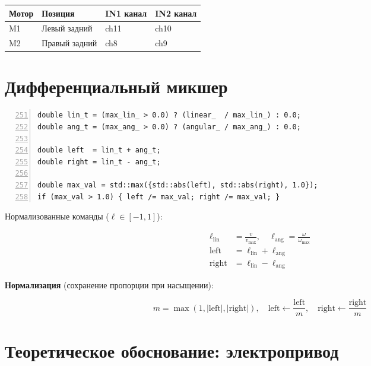 \begin{center}
\begin{tabular}{llll}
\toprule
\textbf{Мотор} & \textbf{Позиция} & \textbf{IN1 канал} & \textbf{IN2 канал}\\
\midrule
M1 & Левый задний    & ch11 & ch10\\
M2 & Правый задний   & ch8  & ch9\\
\bottomrule
\end{tabular}
\end{center}

\section{Дифференциальный микшер}

\begin{filebox}[title={\filepath{motor\_node.cpp}, строки 251--266}]
\begin{lstlisting}[style=cppstyle, numbers=left, firstnumber=251]
double lin_t = (max_lin_ > 0.0) ? (linear_  / max_lin_) : 0.0;
double ang_t = (max_ang_ > 0.0) ? (angular_ / max_ang_) : 0.0;

double left  = lin_t + ang_t;
double right = lin_t - ang_t;

double max_val = std::max({std::abs(left), std::abs(right), 1.0});
if (max_val > 1.0) { left /= max_val; right /= max_val; }
\end{lstlisting}
\end{filebox}

Нормализованные команды ($\ell \in [-1, 1]$):

\begin{align}
  \ell_{\text{lin}} &= \frac{v}{v_{\max}}, \quad
  \ell_{\text{ang}} = \frac{\omega}{\omega_{\max}} \label{eq:norm_cmd}\\[6pt]
  \text{left}  &= \ell_{\text{lin}} + \ell_{\text{ang}} \label{eq:left_mix}\\
  \text{right} &= \ell_{\text{lin}} - \ell_{\text{ang}} \label{eq:right_mix}
\end{align}

\textbf{Нормализация} (сохранение пропорции при насыщении):

\begin{equation}
  m = \max(1, |\text{left}|, |\text{right}|), \quad
  \text{left} \leftarrow \frac{\text{left}}{m}, \quad
  \text{right} \leftarrow \frac{\text{right}}{m}
  \label{eq:mix_normalize}
\end{equation}

\section{Теоретическое обоснование: электропривод}

